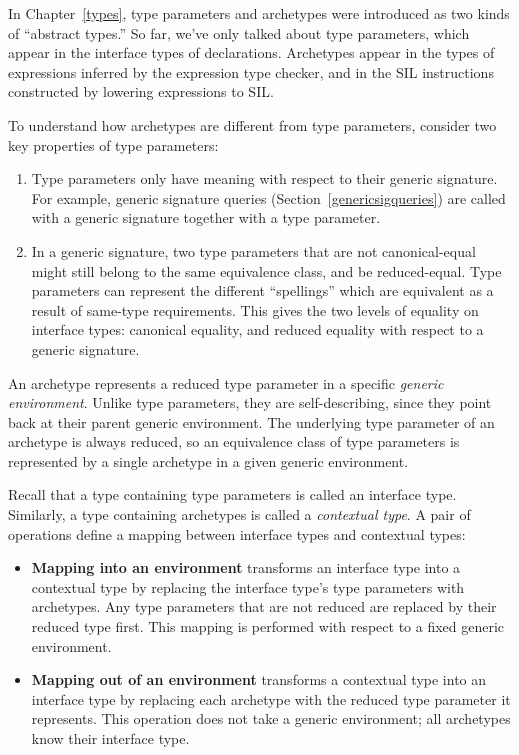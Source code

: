 \documentclass[a4paper,headsepline,bibliography=totoc,toc=flat,fleqn,twoside=semi]{scrbook}
\theoremstyle{definition}
\theoremstyle{definition}
\theoremstyle{definition}
\begin{document}
In Chapter~\ref{types}, type parameters and archetypes were introduced as two kinds of ``abstract types.'' So far, we've only talked about type parameters, which appear in the interface types of declarations. Archetypes appear in the types of expressions inferred by the expression type checker, and in the SIL instructions constructed by lowering expressions to SIL.

To understand how archetypes are different from type parameters, consider two key properties of type parameters:
\begin{enumerate}
\item Type parameters only have meaning with respect to their generic signature. For example, generic signature queries (Section~\ref{genericsigqueries}) are called with a generic signature together with a type parameter.
\item In a generic signature, two type parameters that are not canonical-equal might still belong to the same equivalence class, and be reduced-equal. Type parameters can represent the different ``spellings'' which are equivalent as a result of same-type requirements. This gives the two levels of equality on interface types: canonical equality, and reduced equality with respect to a generic signature.
\end{enumerate}
An archetype represents a reduced type parameter in a specific \emph{generic environment}. Unlike type parameters, they are self-describing, since they point back at their parent generic environment. The underlying type parameter of an archetype is always reduced, so an equivalence class of type parameters is represented by a single archetype in a given generic environment.

Recall that a type containing type parameters is called an interface type. Similarly, a type containing archetypes is called a \emph{contextual type}. A pair of operations define a mapping between interface types and contextual types:
\begin{itemize}
\item \textbf{Mapping into an environment} transforms an interface type into a contextual type by replacing the interface type's type parameters with archetypes. Any type parameters that are not reduced are replaced by their reduced type first. This mapping is performed with respect to a fixed generic environment.
\item \textbf{Mapping out of an environment} transforms a contextual type into an interface type by replacing each archetype with the reduced type parameter it represents. This operation does not take a generic environment; all archetypes know their interface type.
\end{itemize}
\end{document}
